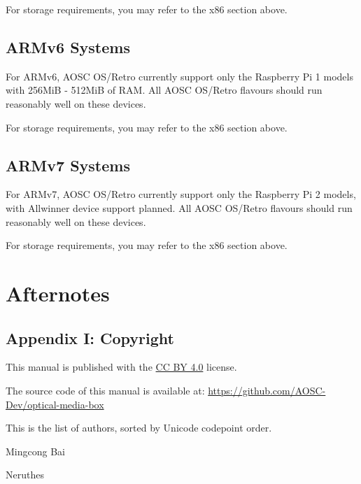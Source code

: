     For storage requirements, you may refer to the x86 section above.

    \section{ARMv6 Systems}

    For ARMv6, AOSC OS/Retro currently support only the Raspberry Pi 1 models
    with 256MiB - 512MiB of RAM. All AOSC OS/Retro flavours should run reasonably well on these devices.

    For storage requirements, you may refer to the x86 section above.

    \section{ARMv7 Systems}

    For ARMv7, AOSC OS/Retro currently support only the Raspberry Pi 2 models,
    with Allwinner device support planned.
    All AOSC OS/Retro flavours should run reasonably well on these devices.

    For storage requirements, you may refer to the x86 section above.



    \chapter{Afternotes}
    
    \section{Appendix I: Copyright}

    This manual is published with the \underline{CC BY 4.0} license.

    The source code of this manual is available at:\newline
    \hspace{2em}\underline{\ttfamily\footnotesize{https://github.com/AOSC-Dev/optical-media-box}}

    \vspace{1ex}This is the list of authors, sorted by Unicode codepoint order.

    \begin{compactitem}
        \item Mingcong Bai
        \item Neruthes
    \end{compactitem}

    \pagestyle{empty}
    \clearpage

    \makebackcoverpage
